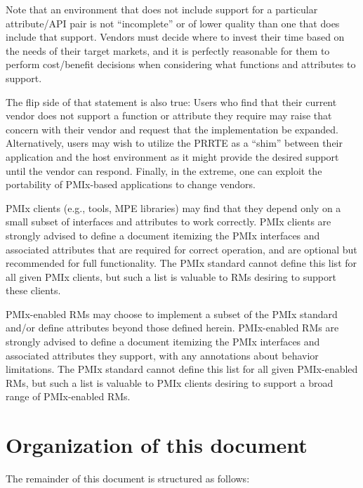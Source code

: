 Note that an environment that does not include support for a particular attribute/\ac{API} pair is not ``incomplete'' or of lower quality than one that does include that support. Vendors must decide where to invest their time based on the needs of their target markets, and it is perfectly reasonable for them to perform cost/benefit decisions when considering what functions and attributes to support.

The flip side of that statement is also true: Users who find that their current vendor does not support a function or attribute they require may raise that concern with their vendor and request that the implementation be expanded. Alternatively, users may wish to utilize the \ac{PRRTE} as a ``shim'' between their application and the host environment as it might provide the desired support until the vendor can respond. Finally, in the extreme, one can exploit the portability of PMIx-based applications to change vendors.

\ac{PMIx} clients (e.g., tools, \ac{MPE} libraries) may find that they depend only on a small subset of interfaces and attributes to work correctly.
\ac{PMIx} clients are strongly advised to define a document itemizing the \ac{PMIx} interfaces and associated attributes that are required for correct operation, and are optional but recommended for full functionality.
The \ac{PMIx} standard cannot define this list for all given \ac{PMIx} clients, but such a list is valuable to \acp{RM} desiring to support these clients.

\ac{PMIx}-enabled \acp{RM} may choose to implement a subset of the \ac{PMIx} standard and/or define attributes beyond those defined herein.
\ac{PMIx}-enabled \acp{RM} are strongly advised to define a document itemizing the \ac{PMIx} interfaces and associated attributes they support, with any annotations about behavior limitations.
The \ac{PMIx} standard cannot define this list for all given \ac{PMIx}-enabled \acp{RM}, but such a list is valuable to \ac{PMIx} clients desiring to support a broad range of \ac{PMIx}-enabled \acp{RM}.



\section{Organization of this document}

The remainder of this document is structured as follows:

